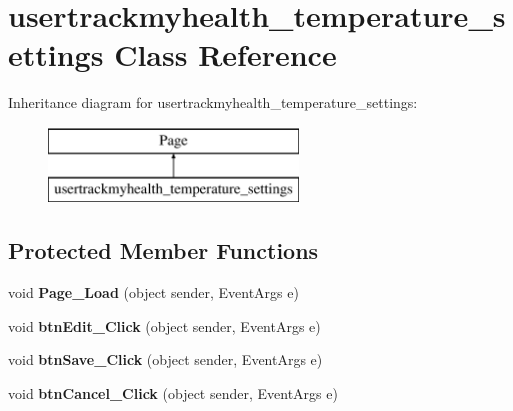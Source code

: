 \hypertarget{classusertrackmyhealth__temperature__settings}{\section{usertrackmyhealth\-\_\-temperature\-\_\-settings Class Reference}
\label{classusertrackmyhealth__temperature__settings}
}
Inheritance diagram for usertrackmyhealth\-\_\-temperature\-\_\-settings\-:\begin{figure}[H]
\begin{center}
\leavevmode
\includegraphics[height=2.000000cm]{classusertrackmyhealth__temperature__settings}
\end{center}
\end{figure}
\subsection*{Protected Member Functions}
\begin{DoxyCompactItemize}
\item 
\hypertarget{classusertrackmyhealth__temperature__settings_a704ea57408bd5ea488c756feabecbf21}{void {\bfseries Page\-\_\-\-Load} (object sender, Event\-Args e)}\label{classusertrackmyhealth__temperature__settings_a704ea57408bd5ea488c756feabecbf21}

\item 
\hypertarget{classusertrackmyhealth__temperature__settings_abc2334e5fd52d8e87db08db0e99fba41}{void {\bfseries btn\-Edit\-\_\-\-Click} (object sender, Event\-Args e)}\label{classusertrackmyhealth__temperature__settings_abc2334e5fd52d8e87db08db0e99fba41}

\item 
\hypertarget{classusertrackmyhealth__temperature__settings_ab4b648784884964e814cb1f8aec942ce}{void {\bfseries btn\-Save\-\_\-\-Click} (object sender, Event\-Args e)}\label{classusertrackmyhealth__temperature__settings_ab4b648784884964e814cb1f8aec942ce}

\item 
\hypertarget{classusertrackmyhealth__temperature__settings_a9e0fffdf8de65d7dee70c43b51824e43}{void {\bfseries btn\-Cancel\-\_\-\-Click} (object sender, Event\-Args e)}\label{classusertrackmyhealth__temperature__settings_a9e0fffdf8de65d7dee70c43b51824e43}

\end{DoxyCompactItemize}


